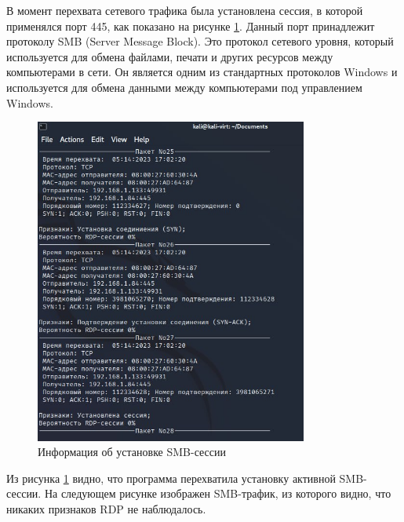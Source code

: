\documentclass[bachelor, och, coursework]{SCWorks}
\begin{document}
В момент перехвата сетевого трафика была установлена сессия, в которой применялся порт 445, как показано на рисунке \ref{smb1}.
Данный порт принадлежит протоколу SMB (Server Message Block). Это протокол сетевого уровня, который используется для обмена 
файлами, печати и других ресурсов между компьютерами в сети. Он является одним из стандартных протоколов Windows и используется 
для обмена данными между компьютерами под управлением Windows.


\begin{figure}[H]
  \centering
  \includegraphics[width=0.8\textwidth]{photo/smb1.jpg}
  \caption{Информация об установке SMB-сессии}
  \label{smb1}
\end{figure}

Из рисунка \ref{smb1} видно, что программа перехватила установку активной SMB-сессии. На следующем рисунке изображен SMB-трафик,
из которого видно, что никаких признаков RDP не наблюдалось.
\end{document}
